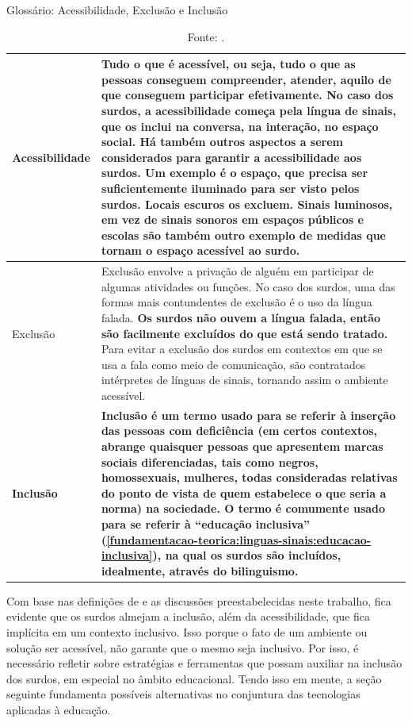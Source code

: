 \begin{table}[htbp]
\caption{Glossário: Acessibilidade, Exclusão e Inclusão}
\label{tab:glossario:acessibilidade-exclusao-inclusao}
\begin{tabularx}{\textwidth}{l|X} \hline
Acessibilidade &  Tudo o que é acessível, ou seja, tudo o que as pessoas conseguem compreender, atender, aquilo de que conseguem participar efetivamente. \textbf{No caso dos surdos, a acessibilidade começa pela língua de sinais, que os inclui na conversa, na interação, no espaço social.} Há também outros aspectos a serem considerados para garantir a acessibilidade aos surdos. Um exemplo é o espaço, que precisa ser suficientemente iluminado para ser visto pelos surdos. Locais escuros os excluem. Sinais luminosos, em vez de sinais sonoros em espaços públicos e escolas são também outro exemplo de medidas que tornam o espaço acessível ao surdo.\\ \hline
Exclusão & Exclusão envolve a privação de alguém em participar de algumas atividades ou funções. No caso dos surdos, uma das formas mais contundentes de exclusão é o uso da língua falada. \textbf{Os surdos não ouvem a língua falada, então são facilmente excluídos do que está sendo tratado.} Para evitar a exclusão dos surdos em contextos em que se usa a fala como meio de comunicação, são contratados intérpretes de línguas de sinais, tornando assim o ambiente acessível. \\ \hline
\textbf{Inclusão} & \textbf{Inclusão é um termo usado para se referir à inserção das pessoas com deficiência (em certos contextos, abrange quaisquer pessoas que apresentem marcas sociais diferenciadas, tais como negros, homossexuais, mulheres, todas consideradas relativas do ponto de vista de quem estabelece o que seria a norma) na sociedade. O termo é comumente usado para se referir à ``educação inclusiva'' (\autoref{fundamentacao-teorica:linguas-sinais:educacao-inclusiva}), na qual os surdos são incluídos, idealmente, através do bilinguismo.} \\ \hline
\end{tabularx}
\caption*{Fonte: .}
\end{table}

Com base nas definições de  e as discussões preestabelecidas neste trabalho, fica evidente que os surdos almejam a inclusão, além da acessibilidade, que fica implícita em um contexto inclusivo. Isso porque o fato de um ambiente ou solução ser acessível, não garante que o mesmo seja inclusivo. Por isso, é necessário refletir sobre estratégias e ferramentas que possam auxiliar na inclusão dos surdos, em especial no âmbito educacional. Tendo isso em mente, a seção seguinte fundamenta possíveis alternativas no conjuntura das tecnologias aplicadas à educação.

